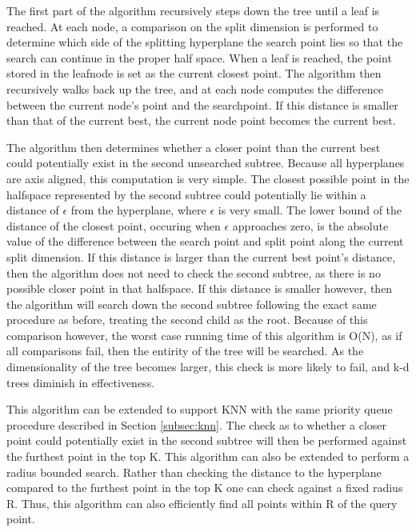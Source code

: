 The first part of the algorithm recursively steps down the tree until a leaf is reached.  At each node, a comparison on the split dimension is performed to determine which side of the splitting hyperplane the search point lies so that the search can continue in the proper half space.  When a leaf is reached, the point stored in the leafnode is set as the current closest point.  The algorithm then recursively walks back up the tree, and at each node computes the difference between the current node's point and the searchpoint.  If this distance is smaller than that of the current best, the current node point becomes the current best.

The algorithm then determines whether a closer point than the current best could potentially exist in the second unsearched subtree.  Because all hyperplanes are axis aligned, this computation is very simple.  The closest possible point in the halfspace represented by the second subtree could potentially lie within a distance of $\epsilon$ from the hyperplane, where $\epsilon$ is very small.  The lower bound of the distance of the closest point, occuring when $\epsilon$ approaches zero, is the absolute value of the difference between the search point and split point along the current split dimension.  If this distance is larger than the current best point's distance, then the algorithm does not need to check the second subtree, as there is no possible closer point in that halfspace.  If this distance is smaller however, then the algorithm will search down the second subtree following the exact same procedure as before, treating the second child as the root.  Because of this comparison however, the worst case running time of this algorithm is O(N), as if all comparisons fail, then the entirity of the tree will be searched.  As the dimensionality of the tree becomes larger, this check is more likely to fail, and k-d trees diminish in effectiveness.

This algorithm can be extended to support KNN with the same priority queue procedure described in Section \ref{subsec:knn}.  The check as to whether a closer point could potentially exist in the second subtree will then be performed against the furthest point in the top K.  This algorithm can also be extended to perform a radius bounded search.  Rather than checking the distance to the hyperplane compared to the furthest point in the top K one can check against a fixed radius R.  Thus, this algorithm can also efficiently find all points within R of the query point.

